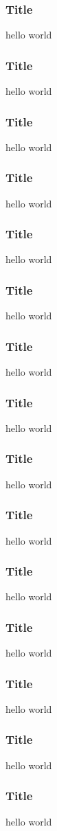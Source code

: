\documentclass[12pt,letterpaper]{beamer}
\begin{document}
\begin{frame}
\frametitle{Title}
hello world
\end{frame}

\begin{frame}
\frametitle{Title}
hello world
\end{frame}

\begin{frame}
\frametitle{Title}
hello world
\end{frame}

\begin{frame}
\frametitle{Title}
hello world
\end{frame}

\begin{frame}
\frametitle{Title}
hello world
\end{frame}

\begin{frame}
\frametitle{Title}
hello world
\end{frame}

\begin{frame}
\frametitle{Title}
hello world
\end{frame}

\begin{frame}
\frametitle{Title}
hello world
\end{frame}

\begin{frame}
\frametitle{Title}
hello world
\end{frame}

\begin{frame}
\frametitle{Title}
hello world
\end{frame}

\begin{frame}
\frametitle{Title}
hello world
\end{frame}

\begin{frame}
\frametitle{Title}
hello world
\end{frame}

\begin{frame}
\frametitle{Title}
hello world
\end{frame}

\begin{frame}
\frametitle{Title}
hello world
\end{frame}

\begin{frame}
\frametitle{Title}
hello world
\end{frame}
\end{document}
